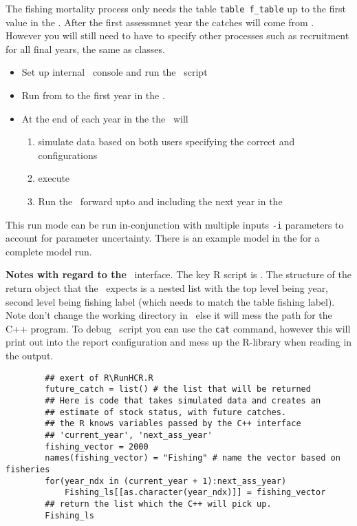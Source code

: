 The fishing mortality process  only needs the table \texttt{table f\_table} up to the first value in the . After the first assessmnet year the catches will come from \R. However you will still need to have to specify other processes such as recruitment for all final years, the same as  classes.


\begin{itemize}
  \item Set up internal \R\ console and run the \R\ script 
  \item Run from  to the first year in the .
  \item At the end of each year in the  the \IBM\ will 
  \begin{enumerate}
  \item simulate data based on both users specifying the correct  and  configurations
  \item execute 
  \item Run the \IBM\ forward upto and including the next year in the  
  \end{enumerate}
\end{itemize}

This run mode can be run in-conjunction with multiple inputs \texttt{-i} parameters to account for parameter uncertainty. There is an example model in the  for a complete model run.


\textbf{Notes with regard to the} \R\ interface. The key R script is . The structure of the return object that the \IBM\ expects is a nested list with the top level being year, second level being fishing label (which needs to match the table fishing label). Note don't change the working directory in \R\ else it will mess the path for the C++ program. To debug \R\ script you can use the \texttt{cat} command, however this will print out into the report configuration and mess up the R-library when reading in the output.
 
{\small{\begin{verbatim}
		## exert of R\RunHCR.R
		future_catch = list() # the list that will be returned
		## Here is code that takes simulated data and creates an 
		## estimate of stock status, with future catches.
		## the R knows variables passed by the C++ interface
		## 'current_year', 'next_ass_year'
		fishing_vector = 2000
		names(fishing_vector) = "Fishing" # name the vector based on fisheries
		for(year_ndx in (current_year + 1):next_ass_year)
			Fishing_ls[[as.character(year_ndx)]] = fishing_vector
		## return the list which the C++ will pick up.
		Fishing_ls
\end{verbatim}}}


